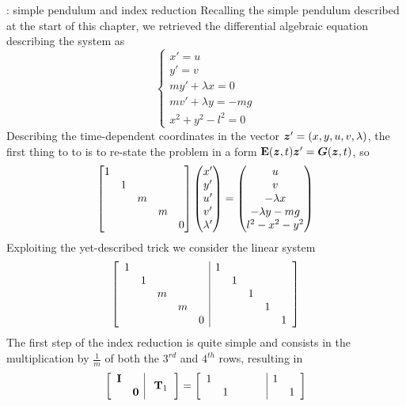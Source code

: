 	\begin{example}{: simple pendulum and index reduction}
		Recalling the simple pendulum described at the start of this chapter, we retrieved the differential algebraic equation describing the system as
		\[ \begin{cases}
			x' = u \\ y' = v \\ m y' + \lambda x = 0 \\ m v' + \lambda y = - mg \\ x^2 + y^2 - l^2 = 0
		\end{cases} \]
		Describing the time-dependent coordinates in the vector $\boldsymbol{z}' = (x,y,u,v,\lambda)$, the first thing to to is to re-state the problem in a form $\mathbf{E}(\boldsymbol{z},t) \boldsymbol{z}' = \boldsymbol{G}(\boldsymbol{z}, t)$, so
		\[ \begin{bmatrix}  1  \\ & 1 \\ && m \\ &&& m \\ &&&& 0  \end{bmatrix} \begin{pmatrix} x' \\ y' \\ u' \\ v' \\ \lambda' \end{pmatrix} = \begin{pmatrix} u \\ v \\ -\lambda x \\ -\lambda y - mg \\ l^2 - x^2 - y^2 \end{pmatrix} \]
		Exploiting the yet-described trick we consider the linear system
		\[ \begin{bmatrix} \begin{array} {ccccc | ccccc}
			1 &&&&& 1 \\
			& 1 &&&&& 1 \\
			&& m &&&&& 1 \\
			&&& m &&&&& 1 \\
			&&&& 0 &&&&& 1 \\
		\end{array} \end{bmatrix} \]
		The first step of the index reduction is quite simple and consists in the multiplication by $\frac 1 m$ of both the $3^{rd}$ and $4^{th}$ rows, resulting in
		\[ \left[ \begin{array} {c  c |} 
			\mathbf{I} & \\ & \mathbf{0}
		\end{array} \hspace{3mm} \mathbf{T}_1 \hspace{2mm} \right] = \begin{bmatrix} \begin{array} {ccccc | ccccc}
			1 &&&&& 1 \\
			& 1 &&&&& 1 \\

\end{array} \end{bmatrix}\]
\end{example}
